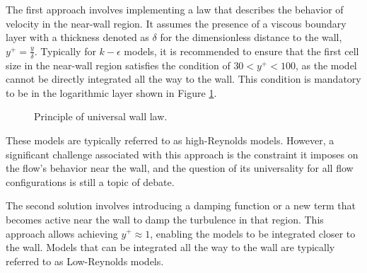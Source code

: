 The first approach involves implementing a law that describes the behavior of velocity in the near-wall region. It assumes the presence of a viscous boundary layer with a thickness denoted as $\delta$ for the dimensionless distance to the wall, $y^+=\frac{y}{\delta}$. Typically for $k-\epsilon$ models, it is recommended to ensure that the first cell size in the near-wall region satisfies the condition of $30 < y^+ < 100$, as the model cannot be directly integrated all the way to the wall. This condition is mandatory to be in the logarithmic layer shown in Figure \ref{fig:CL}.
\begin{figure}[!ht]
\centering
{}
\caption{Principle of universal wall law.}
\label{fig:CL}
\end{figure}
These models are typically referred to as high-Reynolds models. However, a significant challenge associated with this approach is the constraint it imposes on the flow's behavior near the wall, and the question of its universality for all flow configurations is still a topic of debate.

The second solution involves introducing a damping function or a new term that becomes active near the wall to damp the turbulence in that region. This approach allows achieving $y^+\approx 1$, enabling the models to be integrated closer to the wall. Models that can be integrated all the way to the wall are typically referred to as Low-Reynolds models.
